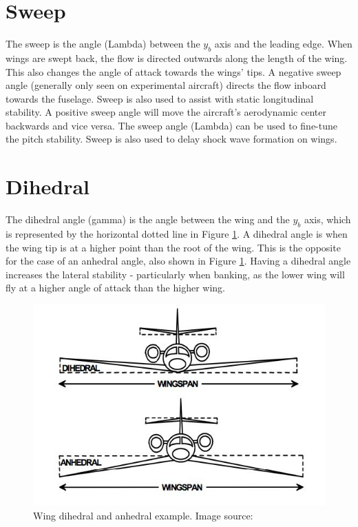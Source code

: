 \section{Sweep}
The sweep is the angle (\acrshort{Lambda}) between the $y_b$ axis and the leading edge. When wings are swept back, the flow is directed outwards along the length of the wing. This also changes the angle of attack towards the wings' tips. A negative sweep angle (generally only seen on experimental aircraft) directs the flow inboard towards the fuselage. Sweep is also used to assist with static longitudinal stability. A positive sweep angle will move the aircraft's aerodynamic center backwards and vice versa. The sweep angle (\acrshort{Lambda}) can be used to fine-tune the pitch stability. Sweep is also used to delay shock wave formation on wings.




\section{Dihedral}
The dihedral angle (\acrshort{gamma}) is the angle between the wing and the $y_b$ axis, which is represented by the horizontal dotted line in Figure \ref{fig:dihedral}. A dihedral angle is when the wing tip is at a higher point than the root of the wing. This is the opposite for the case of an anhedral angle, also shown in Figure \ref{fig:dihedral}. Having a dihedral angle increases the lateral stability - particularly when banking, as the lower wing will fly at a higher angle of attack than the higher wing. 

\begin{figure}[H]
  \centering
   \includegraphics[width=0.6\linewidth]{03_LiteratureReview/Figs/dihedral.jpg}
  \caption{Wing dihedral and anhedral example. Image source: \cite{moreplane}}
  \label{fig:dihedral}
\end{figure}

